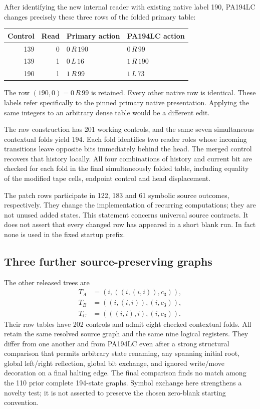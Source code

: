 \documentclass[11pt,a4paper]{article}
\begin{document}
After identifying the new internal reader with existing native label
190, PA194LC changes precisely these three rows of the folded primary
table:
\begin{center}
\begin{tabular}{@{}rrll@{}}
\toprule
Control & Read & Primary action & PA194LC action\\
\midrule
139 & 0 & $0\,R\,190$ & $0\,R\,99$\\
139 & 1 & $0\,L\,16$ & $1\,R\,190$\\
190 & 1 & $1\,R\,99$ & $1\,L\,73$\\
\bottomrule
\end{tabular}
\end{center}
The row $(190,0)=0\,R\,99$ is retained. Every other native row is
identical. These labels refer specifically to the pinned primary native
presentation. Applying the same integers to an arbitrary dense table
would be a different edit.

The raw construction has 201 working controls, and the same seven
simultaneous contextual folds yield 194. Each fold identifies two reader
roles whose incoming transitions leave opposite bits immediately behind
the head. The merged control recovers that history locally. All four
combinations of history and current bit are checked for each fold in
the final simultaneously folded table, including equality of the
modified tape cells, endpoint control and head displacement.

The patch rows participate in 122, 183 and 61 symbolic source outcomes,
respectively. They change the implementation of recurring computations;
they are not unused added states. This statement concerns universal source
contracts. It does not assert that every changed row has appeared in a
short blank run. In fact none is used in the fixed startup prefix.

\subsection{Three further source-preserving graphs}

The other released trees are
\begin{align*}
T_A&=(i,((i,(i,i)),c_3)),\\
T_B&=((i,(i,i)),(i,c_3)),\\
T_C&=(((i,i),i),(i,c_3)).
\end{align*}
Their raw tables have 202 controls and admit eight checked contextual
folds. All retain the same resolved source graph and the same nine logical
registers. They differ from one another and from PA194LC even after a
strong structural comparison that permits arbitrary state renaming,
any spanning initial root, global left/right reflection, global bit
exchange, and ignored write/move decoration on a final halting edge.
The final comparison finds no match among the 110 prior complete
194-state graphs. Symbol exchange here strengthens a novelty test; it is
not asserted to preserve the chosen zero-blank starting convention.
\end{document}
